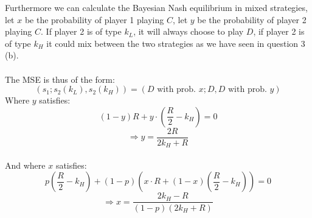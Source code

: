 \documentclass[a4paper]{article}
\begin{document}
\begin{enumerate}[(a)]
Furthermore we can calculate the Bayesian Nash equilibrium in mixed strategies, let $x$ be the probability of player 1 playing $C$, let $y$ be the probability of player 2 playing $C$. If player 2 is of type $k_L$, it will always choose to play $D$, if player 2 is of type $k_H$ it could mix between the two strategies as we have seen in question 3 (b).
\\ \\
The MSE is thus of the form:
$$\left(s_1;s_2(k_L),s_2(k_H)\right)=\left(D \text{ with prob. }x; D, D\text{ with prob. }y\right)$$
Where $y$ satisfies: $$(1-y)R +y\cdot\left(\frac{R}{2}-k_H\right)=0$$
$$\Rightarrow y=\dfrac{2R}{2k_H+R}$$\\ 
And where $x$ satisfies: $$p\left(\frac{R}{2}-k_H\right)+(1-p)\left(x\cdot R+(1-x)\left(\frac{R}{2}-k_H\right)\right)=0$$
$$\Rightarrow x=\dfrac{2k_H-R}{(1-p)(2k_H+R)}$$
\end{enumerate}
\end{document}
